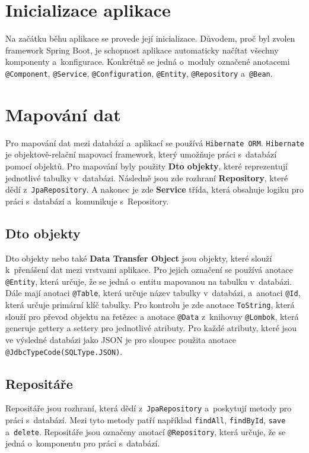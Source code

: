 \newpage

\section{Inicializace aplikace}
Na začátku běhu aplikace se provede její inicializace.
Důvodem, proč byl zvolen framework Spring Boot, je schopnost aplikace automaticky
načítat všechny komponenty a~konfigurace.
Konkrétně se jedná o~moduly označené anotacemi \texttt{@Component}, \texttt{@Service},
\texttt{@Configuration}, \texttt{@Entity}, \texttt{@Repository} a~\texttt{@Bean}.

\section{Mapování dat}
\label{sec:mapovaniDat}
Pro mapování dat mezi databází a~aplikací se používá \texttt{Hibernate ORM}.
\texttt{Hibernate} je objektově-relační mapovací framework, který umožňuje práci s~databází pomocí objektů.
Pro mapování byly použity \textbf{Dto objekty}, které reprezentují jednotlivé tabulky v~databázi.
Následně jsou zde rozhraní \textbf{Repository}, které dědí z~\texttt{JpaRepository}.
A nakonec je zde \textbf{Service} třída, která obsahuje logiku pro práci s~databází a~komunikuje s~Repository.

\subsection{Dto objekty}
Dto objekty nebo také \textbf{Data Transfer Object} jsou objekty, které slouží k~přenášení dat mezi vrstvami aplikace.
Pro jejich označení se používá anotace \texttt{@Entity}, která určuje, že se jedná o~entitu mapovanou na tabulku v~databázi.
Dále mají anotaci \texttt{@Table}, která určuje název tabulky v~databázi, a~anotaci \texttt{@Id}, která určuje primární klíč tabulky.
Pro kontrolu je zde anotace \texttt{ToString}, která slouží pro převod objektu na řetězec a anotace \texttt{@Data} 
z~knihovny \texttt{@Lombok}, která generuje gettery a settery pro jednotlivé atributy.
Pro každé atributy, které jsou ve výsledné databázi jako JSON je pro sloupec použita anotace \texttt{@JdbcTypeCode(SQLType.JSON)}.

\subsection{Repositáře}
Repositáře jsou rozhraní, která dědí z~\texttt{JpaRepository} a~poskytují metody pro práci s~databází.
Mezi tyto metody patří například \texttt{findAll}, \texttt{findById}, \texttt{save} a~\texttt{delete}.
Repositáře jsou označeny anotací \texttt{@Repository}, která určuje, že se jedná o~komponentu pro práci s~databází.

